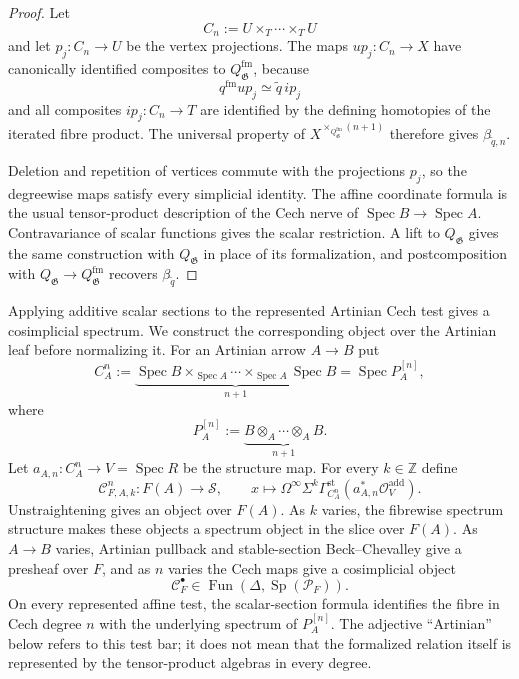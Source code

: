 \begin{proof}
Let
\[
    C_n:=U\times_T\cdots\times_TU
\]
and let $p_j:C_n\to U$ be the vertex projections.  The maps
$up_j:C_n\to X$ have canonically identified composites to
$Q_{\mathfrak G}^{\mathrm{fm}}$, because
\[
    q^{\mathrm{fm}}up_j
    \simeq
    \widetilde q\,ip_j
\]
and all composites $ip_j:C_n\to T$ are identified by the defining homotopies
of the iterated fibre product.  The universal property of
$X^{\times_{Q_{\mathfrak G}^{\mathrm{fm}}}(n+1)}$ therefore gives
$\beta_{\widetilde q,n}$.

Deletion and repetition of vertices commute with the projections $p_j$, so
the degreewise maps satisfy every simplicial identity.  The affine coordinate
formula is the usual tensor-product description of the Cech nerve of
$\operatorname{Spec}B\to\operatorname{Spec}A$.  Contravariance of scalar
functions gives the scalar restriction.  A lift to $Q_{\mathfrak G}$ gives the
same construction with $Q_{\mathfrak G}$ in place of its formalization, and
postcomposition with
$Q_{\mathfrak G}\to Q_{\mathfrak G}^{\mathrm{fm}}$ recovers
$\beta_{\widetilde q}$.
\end{proof}

Applying additive scalar sections to the represented Artinian Cech test gives
a cosimplicial spectrum.  We construct the corresponding object over the
Artinian leaf before normalizing it.  For an Artinian arrow $A\to B$ put
\[
    C_A^n
    :=
    \underbrace{
        \operatorname{Spec}B
        \times_{\operatorname{Spec}A}\cdots
        \times_{\operatorname{Spec}A}
        \operatorname{Spec}B
    }_{n+1}
    =
    \operatorname{Spec}P_A^{[n]},
\]
where
\[
    P_A^{[n]}
    :=
    \underbrace{B\otimes_A\cdots\otimes_A B}_{n+1}.
\]
Let $a_{A,n}:C_A^n\to V=\operatorname{Spec}R$ be the structure map.  For every
$k\in\mathbb Z$ define
\[
    \mathscr C^n_{F,A,k}:F(A)\longrightarrow\mathcal S,
    \qquad
    x\longmapsto
    \Omega^\infty\Sigma^k
    \Gamma_{C_A^n}^{\mathrm{st}}
    \left(
        a_{A,n}^*\mathcal O_V^{\mathrm{add}}
    \right).
\]
Unstraightening gives an object over $F(A)$.  As $k$ varies, the fibrewise
spectrum structure makes these objects a spectrum object in the slice over
$F(A)$.  As $A\to B$ varies, Artinian pullback and stable-section
Beck--Chevalley give a presheaf over $F$, and as $n$ varies the Cech maps give
a cosimplicial object
\[
\boxed{
    \mathscr C_F^\bullet
    \in
    \operatorname{Fun}
    \left(
        \Delta,
        \operatorname{Sp}(\mathcal P_F)
    \right).
}
\]
On every represented affine test, the scalar-section formula identifies the
fibre in Cech degree $n$ with the underlying spectrum of $P_A^{[n]}$.
The adjective ``Artinian'' below refers to this test bar; it does not mean
that the formalized relation itself is represented by the tensor-product
algebras in every degree.

